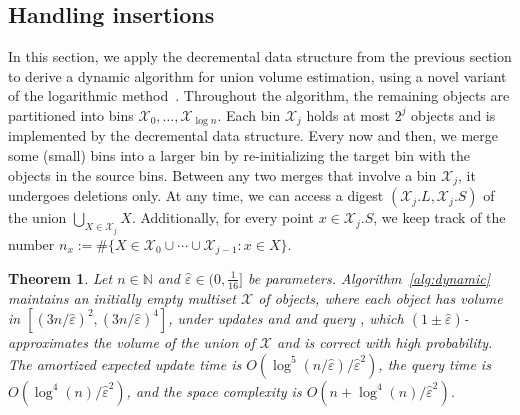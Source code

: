 \documentclass[11pt]{article}
\def\Natural{\mathbb{N}}
\let\N\Natural
\newtheorem{theorem}{Theorem}[section]
\newcommand{\eps}{\varepsilon}
\newcommand{\class}[1]{\mathcal{#1}}
\begin{document}
\subsection{Handling insertions}
In this section, we apply the decremental data structure from the previous section to derive a dynamic algorithm for union volume estimation, using a novel variant of the logarithmic method~\cite{BS80}. Throughout the algorithm, the remaining objects are partitioned into bins $\class{X}_0, \dots, \class{X}_{\log n}$. Each bin $\class{X}_j$ holds at most $2^j$ objects and is implemented by the decremental data structure. Every now and then, we merge some (small) bins into a larger bin by re-initializing the target bin with the objects in the source bins. Between any two merges that involve a bin $\class{X}_j$, it undergoes deletions only. At any time, we can access a digest $(\class{X}_j.L, \class{X}_j.S)$ of the union $\bigcup_{X \in \class{X}_j} X$. Additionally, for every point $x \in \class{X}_j.S$, we keep track of the number $n_x := \#\{ X \in \class{X}_0 \cup \cdots \cup \class{X}_{j-1} : x \in X \}$.
%
\begin{theorem}\label{thm:dynamicintermediate}
    Let $n \in \N$ and $\hat \eps \in (0,\frac{1}{16}]$ be parameters. 
    Algorithm~\ref{alg:dynamic} maintains an initially empty multiset $\class{X}$ of objects, where each object has volume in $[(3n/\hat \eps)^2, (3n/\hat \eps)^4]$, under updates  and  and query \est{}, which $(1\pm\hat \eps)$-approximates the volume of the union of $\class{X}$ and is correct with high probability. The amortized expected update time is $O(\log^5(n/\hat \eps)/\hat \eps^2)$, the query time is $O(\log^4(n)/\hat \eps^2)$, and the space complexity is $O(n + \log^4(n)/\hat \eps^2)$.
\end{theorem}
%
%
\end{document}
